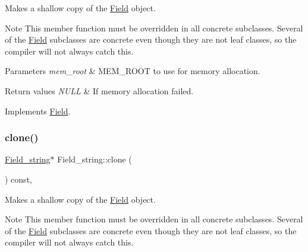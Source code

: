 Makes a shallow copy of the \mbox{\hyperlink{classField}{Field}} object.

\begin{DoxyNote}{Note}
This member function must be overridden in all concrete subclasses. Several of the \mbox{\hyperlink{classField}{Field}} subclasses are concrete even though they are not leaf classes, so the compiler will not always catch this.
\end{DoxyNote}

\begin{DoxyParams}{Parameters}
{\em mem\+\_\+root} & M\+E\+M\+\_\+\+R\+O\+OT to use for memory allocation. \\
\hline
\end{DoxyParams}

\begin{DoxyRetVals}{Return values}
{\em N\+U\+LL} & If memory allocation failed. \\
\hline
\end{DoxyRetVals}


Implements \mbox{\hyperlink{classField_a64979bcb9345803b031fff76a0c3d9fe}{Field}}.

\mbox{\label{classField__string_afeb8a339d94887f12168ab9ffa12ff33}} 
\subsubsection{\texorpdfstring{clone()}{clone()}\hspace{0.1cm}{\footnotesize\ttfamily [2/2]}}
{\footnotesize\ttfamily \mbox{\hyperlink{classField__string}{Field\+\_\+string}}$\ast$ Field\+\_\+string\+::clone (\begin{DoxyParamCaption}{ }\end{DoxyParamCaption}) const\hspace{0.3cm}{\ttfamily [inline]}, {\ttfamily [virtual]}}

Makes a shallow copy of the \mbox{\hyperlink{classField}{Field}} object.

\begin{DoxyNote}{Note}
This member function must be overridden in all concrete subclasses. Several of the \mbox{\hyperlink{classField}{Field}} subclasses are concrete even though they are not leaf classes, so the compiler will not always catch this.
\end{DoxyNote}

